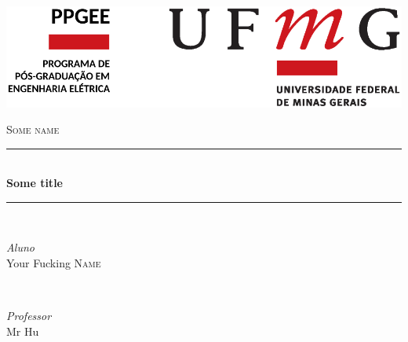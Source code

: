 \begin{titlepage} %
	\newcommand{\HRule}{\rule{\linewidth}{0.5mm}} %
	
	\center %
	
	
	\includegraphics[scale=0.38]{ufmg_header.png}\\[1cm] %
	\vfill\vfill
	
	
	
	
	\textsc{\large Some name}\\[0.5cm] %
	
	
	\HRule\\[0.4cm]
	
	{\huge\bfseries Some title}\\[0.4cm] %
	
	\HRule\\[1.5cm]
	
	
	\begin{minipage}{0.4\textwidth}
		\begin{flushleft}
			\large
			\textit{Aluno}\\
			Your Fucking \textsc{Name}\\ %
		\end{flushleft}
	\end{minipage}
	~
	\begin{minipage}{0.4\textwidth}
		\begin{flushright}
			\large
			\textit{Professor}\\
			Mr Hu %
		\end{flushright}
	\end{minipage}
	

\end{titlepage}
